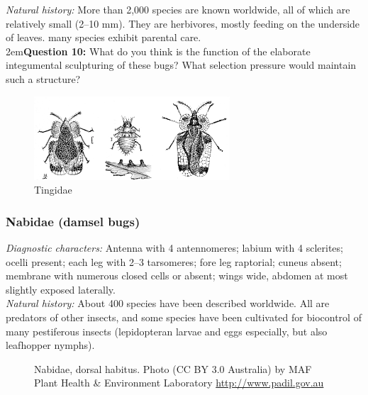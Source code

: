 \documentclass[letterpaper, 11pt]{article}
\begin{document}
\noindent{}\textit{Natural history:} More than 2,000 species are known worldwide, all of which are relatively small (2--10 mm). They are herbivores, mostly feeding on the underside of leaves. many species exhibit parental care. \\

\hangindent2em\textbf{Question 10:} What do you think is the function of the elaborate integumental sculpturing of these bugs? What selection pressure would maintain such a structure?\\

\begin{figure}[ht!]
 \centering
 \includegraphics[width=0.65\textwidth]{tingids.png}
 \caption{Tingidae \citep[][Fig. 38]{bhlitem45622}}
 \label{fig:tingid1}
\end{figure}

\subsubsection{Nabidae (damsel bugs)}
\noindent{}\textit{Diagnostic characters:} Antenna with 4 antennomeres; labium with 4 sclerites; ocelli present; each leg with 2--3 tarsomeres; fore leg raptorial; cuneus absent; membrane with numerous closed cells or absent; wings wide, abdomen at most slightly exposed laterally.\\

\noindent{}\textit{Natural history:} About 400 species have been described worldwide. All are predators of other insects, and some species have been cultivated for biocontrol of many pestiferous insects (lepidopteran larvae and eggs especially, but also leafhopper nymphs). \\

\begin{figure}[ht!]
 \centering
 \caption{Nabidae, dorsal habitus. Photo (CC BY 3.0 Australia) by MAF Plant Health \& Environment Laboratory \url{http://www.padil.gov.au}}
 \label{fig:nabid1}
\end{figure}
\end{document}
